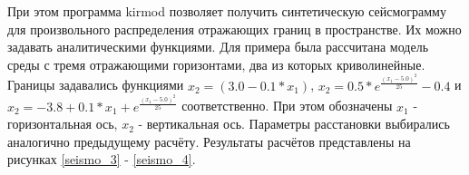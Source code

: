 \documentclass{article}
\begin{document}
При этом программа kirmod позволяет получить синтетическую сейсмограмму для произвольного распределения отражающих границ в пространстве.
Их можно задавать аналитическими функциями.
Для примера была рассчитана модель среды с тремя отражающими горизонтами, два из которых криволинейные.
Границы задавались функциями $x_2 = (3.0 - 0.1 * x_1)$, $x_2 = 0.5 * e^{\frac{(x_1 - 5.0)^2}{25}} - 0.4$ и $x_2 = -3.8 + 0.1 * x_1 + e^{\frac{(x_1 - 5.0)^2}{25}}$ соответственно.
При этом обозначены $x_1$ - горизонтальная ось, $x_2$ - вертикальная ось.
Параметры расстановки выбирались аналогично предыдущему расчёту.
Результаты расчётов представлены на рисунках \ref{seismo_3} - \ref{seismo_4}.

\noindent
\begin{minipage}{\linewidth}
\label{seismo_3}
\end{minipage}

\noindent
\begin{minipage}{\linewidth}
\label{seismo_4}
\end{minipage}
\end{document}
